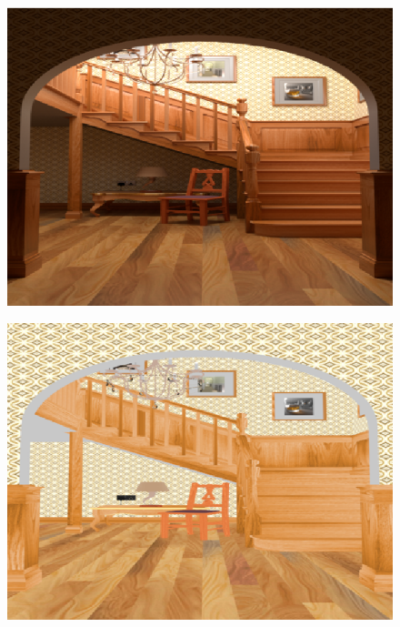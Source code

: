 \begin{figure}[tb]
	\begin{minipage}[b]{0.32\hsize}
		\centering
		\includegraphics[height=0.75\hsize]{images/retinex/input.eps}
		 \label{fig:reinex/input}
	\end{minipage}
	\begin{minipage}[b]{0.32\hsize}
		\centering
		\includegraphics[height=0.75\hsize]{images/retinex/reflectance.eps}
		 \label{fig:retinex/reflectance}
	\end{minipage}
	\begin{minipage}[b]{0.32\hsize}
		\centering

\end{minipage}
\end{figure}
